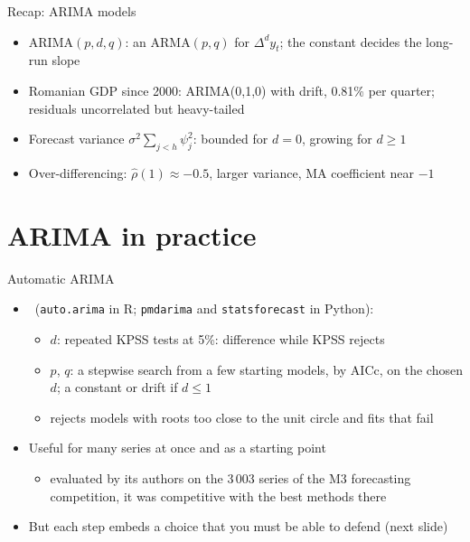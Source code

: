\begin{frame}{Recap: ARIMA models}
\itemsize{\small}
\begin{itemize}
    \item ARIMA$(p,d,q)$: an ARMA$(p,q)$ for $\Delta^d y_t$; the constant decides the long-run slope
    \item Romanian GDP since 2000: ARIMA(0,1,0) with drift, 0.81\% per quarter; residuals uncorrelated but heavy-tailed
    \item Forecast variance $\sigma^2\sum_{j<h}\psi_j^2$: bounded for $d = 0$, growing for $d \ge 1$
    \item Over-differencing: $\hat\rho(1) \approx -0.5$, larger variance, MA coefficient near $-1$
\end{itemize}
\end{frame}


\section{ARIMA in practice}

\begin{frame}{Automatic ARIMA}
\itemsize{\small}
\begin{itemize}
    \item {}\ (\texttt{auto.arima} in R; \texttt{pmdarima} and \texttt{statsforecast} in Python):
    \begin{itemize}
        \item $d$: repeated KPSS tests at 5\%: difference while KPSS rejects
        \item $p$, $q$: a stepwise search from a few starting models, by AICc, on the chosen $d$; a constant or drift if $d \le 1$
        \item rejects models with roots too close to the unit circle and fits that fail
    \end{itemize}
    \item Useful for many series at once and as a starting point
    \begin{itemize}
        \item evaluated by its authors on the 3\,003 series of the M3 forecasting competition, it was competitive with the best methods there
    \end{itemize}
    \item But each step embeds a choice that you must be able to defend (next slide)
\end{itemize}
\end{frame}

